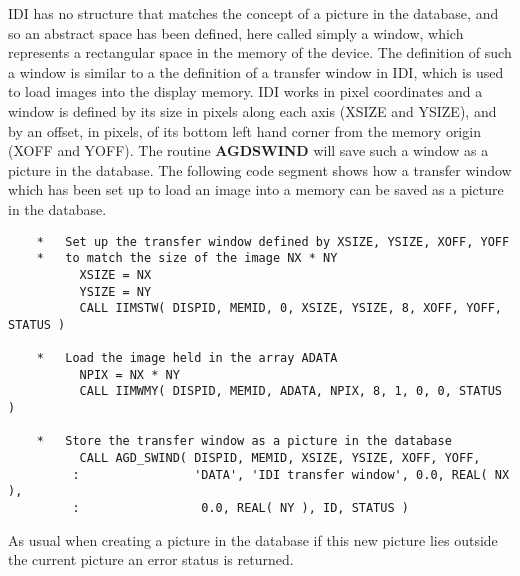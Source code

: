 \documentclass[twoside,11pt]{article}
\newcommand{\htmlref}[2]{#1}
\renewcommand{\_}{\texttt{\symbol{95}}}
\begin{document}
IDI has no structure that matches the concept of a picture in the database,
and so an abstract space has been defined, here called simply a window, which
represents a rectangular space in the memory of the device. The definition
of such a window is similar to a the definition of a transfer window in IDI,
which is used to load images into the display memory.
IDI works in pixel coordinates and a window is defined by its size in
pixels along each axis (XSIZE and YSIZE), and by an offset, in pixels,
of its bottom left hand corner from the memory origin (XOFF and YOFF).
The routine \htmlref{{\bf AGD\_SWIND}}{AGD_SWIND}
will save such a window as a picture in the
database. The following code segment shows how a transfer window which has
been set up to load an image into a memory can be saved as a picture in the
database.
\begin{verbatim}
    *   Set up the transfer window defined by XSIZE, YSIZE, XOFF, YOFF
    *   to match the size of the image NX * NY
          XSIZE = NX
          YSIZE = NY
          CALL IIMSTW( DISPID, MEMID, 0, XSIZE, YSIZE, 8, XOFF, YOFF, STATUS )

    *   Load the image held in the array ADATA
          NPIX = NX * NY
          CALL IIMWMY( DISPID, MEMID, ADATA, NPIX, 8, 1, 0, 0, STATUS )

    *   Store the transfer window as a picture in the database
          CALL AGD_SWIND( DISPID, MEMID, XSIZE, YSIZE, XOFF, YOFF,
         :                'DATA', 'IDI transfer window', 0.0, REAL( NX ),
         :                 0.0, REAL( NY ), ID, STATUS )
\end{verbatim}
As usual when creating a picture in the database if this new picture lies
outside the current picture an error status is returned.
\end{document}
